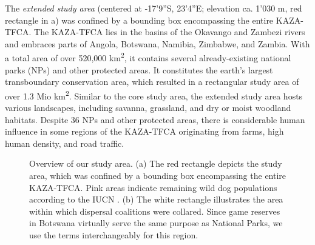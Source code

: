 \documentclass[abstract=on,10pt,a4paper,bibliography=totocnumbered]{scrartcl}
\begin{document}
The \textit{extended study area} (centered at -17'9''S, 23'4''E; elevation ca. 1'030 m, red rectangle in a) was confined
by a bounding box encompassing the entire KAZA-TFCA. The KAZA-TFCA lies in the
basins of the Okavango and Zambezi rivers and embraces parts of Angola,
Botswana, Namibia, Zimbabwe, and Zambia. With a total area of over 520,000
km\textsuperscript{2}, it contains several already-existing national parks (NPs)
and other protected areas. It constitutes the earth's largest transboundary
conservation area, which resulted in a rectangular study area of over 1.3 Mio
km\textsuperscript{2}. Similar to the core study area, the extended study area
hosts various landscapes, including savanna, grassland, and dry or moist
woodland habitats. Despite 36 NPs and other protected areas, there is
considerable human influence in some regions of the KAZA-TFCA originating from
farms, high human density, and road traffic.

\begin{figure}[h]
  \begin{center}
    \caption{Overview of our study area. (a) The red rectangle depicts the study
    area, which was confined by a bounding box encompassing the entire
    KAZA-TFCA. Pink areas indicate remaining wild dog populations according to
    the IUCN \citep{Woodroffe.2012}. (b) The white rectangle illustrates the
    area within which dispersal coalitions were collared. Since game reserves in
    Botswana virtually serve the same purpose as National Parks, we use the
    terms interchangeably for this region.}
    \label{StudyArea}
  \end{center}
\end{figure}
\end{document}
